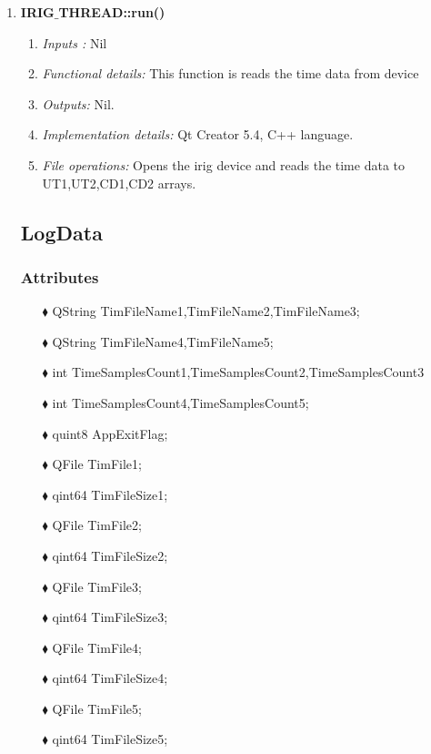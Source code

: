 \begin{enumerate}
\item  \textbf{IRIG$\_$THREAD::run()}
\begin{enumerate}
	\item \textit{Inputs :} Nil
	\item \textit{Functional details:} This function is reads the time data from device
	\item \textit{Outputs:} Nil.
	\item \textit{Implementation details:} Qt Creator 5.4, C++ language.
	\item \textit{File operations:} Opens the irig device and reads the time data to UT1,UT2,CD1,CD2 arrays.
\end{enumerate}






\subsection{LogData}
\subsubsection{Attributes}
\begin{enumerate}
\item [$\blacklozenge$] QString TimFileName1,TimFileName2,TimFileName3;
\item [$\blacklozenge$] QString TimFileName4,TimFileName5;
	\item [$\blacklozenge$] int TimeSamplesCount1,TimeSamplesCount2,TimeSamplesCount3
   \item [$\blacklozenge$] int 	TimeSamplesCount4,TimeSamplesCount5;
	\item [$\blacklozenge$] quint8 AppExitFlag;
	\item [$\blacklozenge$] QFile  TimFile1;
	\item [$\blacklozenge$] qint64 TimFileSize1;
	\item [$\blacklozenge$] QFile  TimFile2;
	\item [$\blacklozenge$] qint64 TimFileSize2;
	\item [$\blacklozenge$] QFile  TimFile3;
	\item [$\blacklozenge$] qint64 TimFileSize3;
	\item [$\blacklozenge$] QFile  TimFile4;
	\item [$\blacklozenge$] qint64 TimFileSize4;
	\item [$\blacklozenge$] QFile  TimFile5;
	\item [$\blacklozenge$] qint64 TimFileSize5;
\end{enumerate}

\end{enumerate}

